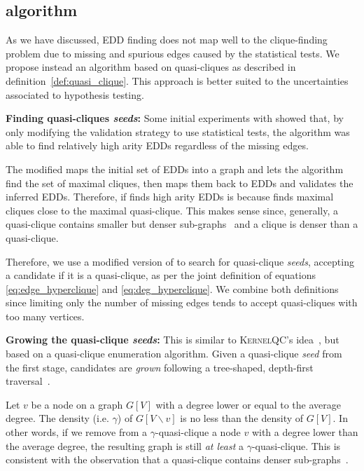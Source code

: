 \subsection{\PresQ algorithm}
\label{sec:presq}

As we have discussed, \gls{EDD} finding does not map well to the clique-finding
problem due to missing and spurious edges caused by the statistical tests. We propose instead
an algorithm based on quasi-cliques as described in definition~\ref{def:quasi_clique}.
This approach is better suited to the uncertainties associated to hypothesis testing.

\textbf{Finding quasi-cliques \emph{seeds}:} Some initial experiments with \Find showed that,
by only modifying the validation strategy to use statistical tests, the algorithm was able
to find relatively high arity \glspl{EDD} regardless of the missing edges.

The modified \Find maps the initial set of \glspl{EDD} into a graph and lets the \Hyperclique
algorithm find the set of maximal cliques, then maps them back to \glspl{EDD} and validates the
inferred \glspl{EDD}. Therefore, if \Find finds high arity \glspl{EDD} is because \Hyperclique finds
maximal cliques close to the maximal quasi-clique. This makes sense since, generally,
a quasi-clique contains smaller but denser sub-graphs~\cite{SaneiMehri2018} and a clique
is denser than a quasi-clique.

Therefore, we use a modified version of \Hyperclique to search for quasi-clique \emph{seeds},
accepting a candidate if it is a quasi-clique, as per the joint definition of equations
\ref{eq:edge_hyperclique} and \ref{eq:deg_hyperclique}.
We combine both definitions since limiting only the number of missing edges tends to accept
quasi-cliques with too many vertices.

\textbf{Growing the quasi-clique \emph{seeds}:} This is similar
to \textsc{KernelQC}'s idea~\cite{SaneiMehri2018}, but based on
a quasi-clique enumeration algorithm. Given a quasi-clique
\emph{seed} from the first stage, candidates are \emph{grown} following a tree-shaped,
depth-first traversal~\cite{uno_efficient_2010}.

Let $v$ be a node on a graph $G[V]$ with a degree lower or equal to the average degree.
The density (i.e. $\gamma$) of $G[V \backslash v]$ is no less than the density of $G[V]$.
In other words, if we remove from a $\gamma$-quasi-clique a node $v$ with a
degree lower than the average degree, the resulting graph is still
\emph{at least} a $\gamma$-quasi-clique.
This is consistent with the observation that a quasi-clique contains
denser sub-graphs~\cite{SaneiMehri2018}.

